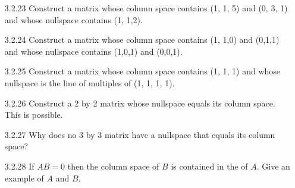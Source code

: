 \documentclass[10pt,twoside,reqno]{article}
\begin{document}
\begin{enumerate}
\item[3.2.23] Construct a matrix whose column space contains (1, 1, 5) and (0, 3, 1) and whose nullspace contains (1, 1,2). \\
\vspace{3mm}



\item[3.2.24] Construct a matrix whose column space contains (1, 1,0) and (0,1,1) and whose nullspace contains (1,0,1) and (0,0,1). \\
\vspace{3mm}



\item[3.2.25] Construct a matrix whose column space contains (1, 1, 1) and whose nullspace is the line of multiples of (1, 1, 1, 1).\\
\vspace{3mm}



\item[3.2.26] Construct a 2 by 2 matrix whose nullspace equals its column space. This is possible. \\
\vspace{3mm}



\item[3.2.27] Why does no 3 by 3 matrix have a nullspace that equals its column space? \\
\vspace{3mm}



\item[3.2.28] If $AB = 0$ then the column space of $B$ is contained in the \underline{\hspace{8mm}} of $A$. Give an example of $A$ and $B$. \\
\vspace{3mm}




\end{enumerate}
\end{document}
